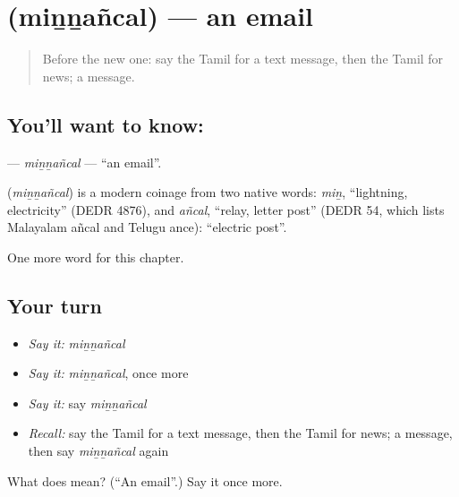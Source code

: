 \section[\texorpdfstring{\ta{மின்னஞ்சல்} (miṉṉañcal)}{மின்னஞ்சல் (miṉṉañcal)}]{ (miṉṉañcal) — an email}

\label{lesson:TA-C185-minnancal}



\begin{quote}
Before the new one: say the Tamil for a text message, then the Tamil for news; a message.
\end{quote}

\subsection*{You'll want to know: }
\textbf{} — \emph{miṉṉañcal} — \textquotedblleft{}an email\textquotedblright{}.

\begin{cousinweb}
\textbf{} (\emph{miṉṉañcal}) is a modern coinage from two native words: \emph{miṉ}, \textquotedblleft{}lightning, electricity\textquotedblright{} (DEDR 4876), and \emph{añcal}, \textquotedblleft{}relay, letter post\textquotedblright{} (DEDR 54, which lists Malayalam añcal and Telugu ance): \textquotedblleft{}electric post\textquotedblright{}.
\end{cousinweb}

\begin{grammarlens}[title={What you've built}]
One more word for this chapter.
\end{grammarlens}

\subsection*{Your turn}
\begin{itemize}
\raggedright
  \item \emph{Say it:} \emph{miṉṉañcal}
  \item \emph{Say it:} \emph{miṉṉañcal}, once more
  \item \emph{Say it:} say \emph{miṉṉañcal}
  \item \emph{Recall:} say the Tamil for a text message, then the Tamil for news; a message, then say \emph{miṉṉañcal} again
\end{itemize}

\begin{tcolorbox}[breakable,colback=teal!4,colframe=teal!35!black,title={Before you move on}]
What does  mean? (\textquotedblleft{}An email\textquotedblright{}.) Say it once more.
\end{tcolorbox}
